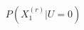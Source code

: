 \documentclass[preview]{standalone}
\begin{document}
\begin{align*}
P(X^{(r)}_1 | U=0)
\end{align*}
\end{document}

